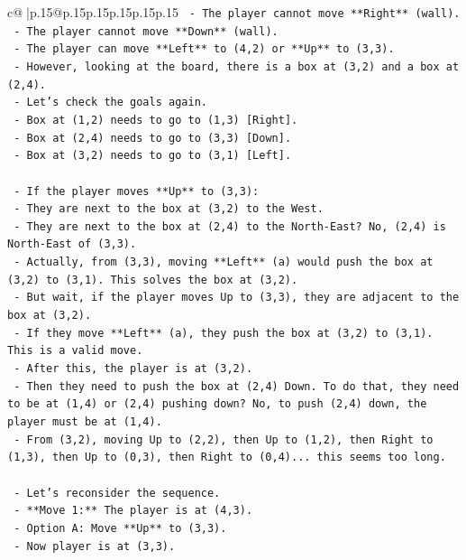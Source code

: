 \documentclass{article}
\begin{document}
{\begin{supertabular}{c@{$\;$}|p{.15\linewidth}@{}p{.15\linewidth}p{.15\linewidth}p{.15\linewidth}p{.15\linewidth}p{.15\linewidth}}
{{{\texttt{    {-} The player cannot move **Right** (wall).} \\
\texttt{    {-} The player cannot move **Down** (wall).} \\
\texttt{    {-} The player can move **Left** to (4,2) or **Up** to (3,3).} \\
\texttt{    {-} However, looking at the board, there is a box at (3,2) and a box at (2,4).} \\
\texttt{    {-} Let's check the goals again.} \\
\texttt{        {-} Box at (1,2) needs to go to (1,3) {[}Right{]}.} \\
\texttt{        {-} Box at (2,4) needs to go to (3,3) {[}Down{]}.} \\
\texttt{        {-} Box at (3,2) needs to go to (3,1) {[}Left{]}.} \\
\\ 
\texttt{    {-} If the player moves **Up** to (3,3):} \\
\texttt{        {-} They are next to the box at (3,2) to the West.} \\
\texttt{        {-} They are next to the box at (2,4) to the North{-}East? No, (2,4) is North{-}East of (3,3).} \\
\texttt{        {-} Actually, from (3,3), moving **Left** (a) would push the box at (3,2) to (3,1). This solves the box at (3,2).} \\
\texttt{        {-} But wait, if the player moves Up to (3,3), they are adjacent to the box at (3,2).} \\
\texttt{        {-} If they move **Left** (a), they push the box at (3,2) to (3,1). This is a valid move.} \\
\texttt{        {-} After this, the player is at (3,2).} \\
\texttt{        {-} Then they need to push the box at (2,4) Down. To do that, they need to be at (1,4) or (2,4) pushing down? No, to push (2,4) down, the player must be at (1,4).} \\
\texttt{        {-} From (3,2), moving Up to (2,2), then Up to (1,2), then Right to (1,3), then Up to (0,3), then Right to (0,4)... this seems too long.} \\
\\ 
\texttt{    {-} Let's reconsider the sequence.} \\
\texttt{    {-} **Move 1:** The player is at (4,3).} \\
\texttt{        {-} Option A: Move **Up** to (3,3).} \\
\texttt{            {-} Now player is at (3,3).} \\
}}}
\end{supertabular}}
\end{document}
